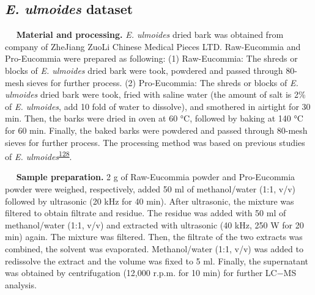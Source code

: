 \hypertarget{e.-ulmoides-dataset}{%
\subsection{\texorpdfstring{\textbf{\emph{E. ulmoides}
dataset}}{E. ulmoides dataset}}\label{e.-ulmoides-dataset}}

   \textbf{Material and processing.} \emph{E. ulmoides} dried bark was
obtained from company of ZheJiang ZuoLi Chinese Medical Pieces LTD.
Raw-Eucommia and Pro-Eucommia were prepared as following: (1)
Raw-Eucommia: The shreds or blocks of \emph{E. ulmoides} dried bark were
took, powdered and passed through 80-mesh sieves for further process.
(2) Pro-Eucommia: The shreds or blocks of \emph{E. ulmoides} dried bark
were took, fried with saline water (the amount of salt is 2\% of
\emph{E. ulmoides}, add 10 fold of water to dissolve), and smothered in
airtight for 30 min. Then, the barks were dried in oven at 60 °C,
followed by baking at 140 °C for 60 min. Finally, the baked barks were
powdered and passed through 80-mesh sieves for further process. The
processing method was based on previous studies of \emph{E.
ulmoides}\textsuperscript{\protect\hyperlink{ref-2010b}{128}}.

   \textbf{Sample preparation.} 2 g of Raw-Eucommia powder and
Pro-Eucommia powder were weighed, respectively, added 50 ml of
methanol/water (1:1, v/v) followed by ultrasonic (20 kHz for 40 min).
After ultrasonic, the mixture was filtered to obtain filtrate and
residue. The residue was added with 50 ml of methanol/water (1:1, v/v)
and extracted with ultrasonic (40 kHz, 250 W for 20 min) again. The
mixture was filtered. Then, the filtrate of the two extracts was
combined, the solvent was evaporated. Methanol/water (1:1, v/v) was
added to redissolve the extract and the volume was fixed to 5 ml.
Finally, the supernatant was obtained by centrifugation (12,000 r.p.m.
for 10 min) for further LC−MS analysis.

